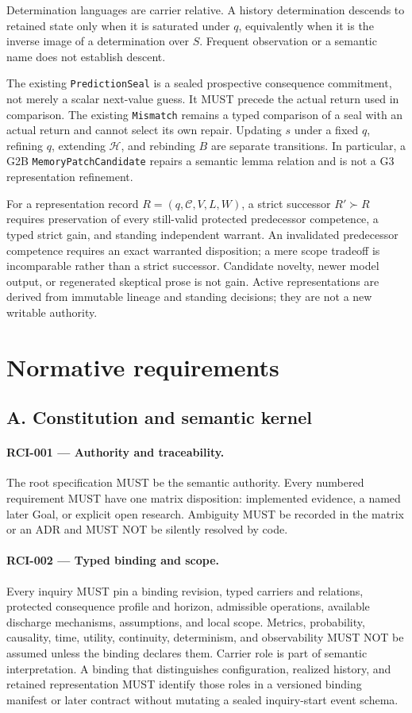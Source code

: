 \documentclass[11pt]{article}
\begin{document}
Determination languages are carrier relative. A history determination descends
to retained state only when it is saturated under $q$, equivalently when it is
the inverse image of a determination over $S$. Frequent observation or a semantic
name does not establish descent.

The existing \texttt{PredictionSeal} is a sealed prospective consequence
commitment, not merely a scalar next-value guess. It MUST precede the actual
return used in comparison. The existing \texttt{Mismatch} remains a typed
comparison of a seal with an actual return and cannot select its own repair.
Updating $s$ under a fixed $q$, refining $q$, extending $\mathcal H$, and rebinding
$B$ are separate transitions. In particular, a G2B \texttt{MemoryPatchCandidate}
repairs a semantic lemma relation and is not a G3 representation refinement.

For a representation record $R=(q,\mathcal C,V,L,W)$, a strict successor
$R'\succ R$ requires preservation of every still-valid protected predecessor
competence, a typed strict gain, and standing independent warrant. An invalidated
predecessor competence requires an exact warranted disposition; a mere scope
tradeoff is incomparable rather than a strict successor. Candidate novelty,
newer model output, or regenerated skeptical prose is not gain. Active
representations are derived from immutable lineage and standing decisions; they
are not a new writable authority.

\section{Normative requirements}

\subsection{A. Constitution and semantic kernel}

\paragraph{RCI-001 --- Authority and traceability.}
The root specification MUST be the semantic authority. Every numbered
requirement MUST have one matrix disposition: implemented evidence, a named
later Goal, or explicit open research. Ambiguity MUST be recorded in the matrix
or an ADR and MUST NOT be silently resolved by code.

\paragraph{RCI-002 --- Typed binding and scope.}
Every inquiry MUST pin a binding revision, typed carriers and relations,
protected consequence profile and horizon, admissible operations, available
discharge mechanisms, assumptions, and local scope. Metrics, probability,
causality, time, utility, continuity, determinism, and observability MUST NOT be
assumed unless the binding declares them. Carrier role is part of semantic
interpretation. A binding that distinguishes configuration, realized history,
and retained representation MUST identify those roles in a versioned binding
manifest or later contract without mutating a sealed inquiry-start event schema.
\end{document}
